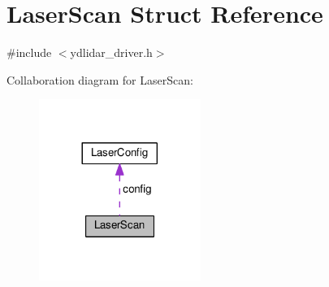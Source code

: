 \hypertarget{struct_laser_scan}{}\section{Laser\+Scan Struct Reference}
\label{struct_laser_scan}


{\ttfamily \#include $<$ydlidar\+\_\+driver.\+h$>$}



Collaboration diagram for Laser\+Scan\+:\nopagebreak
\begin{figure}[H]
\begin{center}
\leavevmode
\includegraphics[width=149pt]{struct_laser_scan__coll__graph}
\end{center}
\end{figure}
